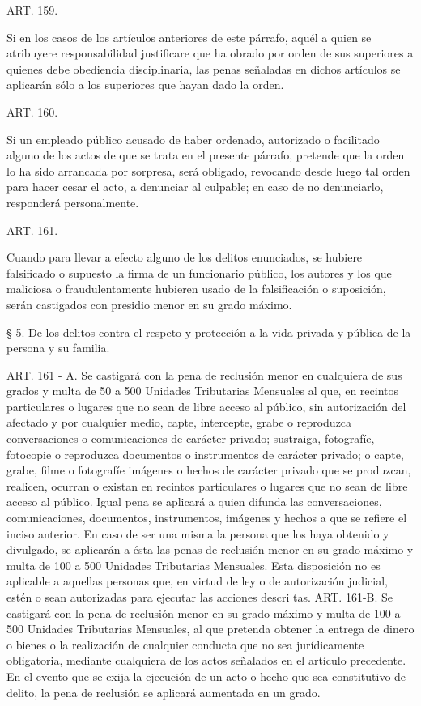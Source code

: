     ART. 159.

    Si en los casos de los artículos anteriores de este párrafo, aquél a quien se atribuyere responsabilidad justificare que ha obrado por orden de sus superiores a quienes debe obediencia disciplinaria, las penas señaladas en dichos artículos se aplicarán sólo a los superiores que hayan dado la orden.


    ART. 160.

    Si un empleado público acusado de haber ordenado, autorizado o facilitado alguno de los actos de que se trata en el presente párrafo, pretende que la orden lo ha sido arrancada por sorpresa, será obligado, revocando desde luego tal orden para hacer cesar el acto, a denunciar al culpable; en caso de no denunciarlo, responderá personalmente.




    ART. 161.

    Cuando para llevar a efecto alguno de los delitos enunciados, se hubiere falsificado o supuesto la firma de un funcionario público, los autores y los que maliciosa o fraudulentamente hubieren usado de la falsificación o suposición, serán castigados con presidio menor en su grado máximo.

    § 5. De los delitos contra el respeto y protección a la vida privada y pública de la persona y su familia.

    ART. 161 - A.
    Se castigará con la pena de reclusión menor en cualquiera de sus grados y multa de 50 a 500 Unidades Tributarias Mensuales al que, en recintos particulares o lugares que no sean de libre acceso al público, sin autorización del afectado y por cualquier medio, capte, intercepte, grabe o reproduzca conversaciones o comunicaciones de carácter privado; sustraiga, fotografíe, fotocopie o reproduzca documentos o instrumentos de carácter privado; o capte, grabe, filme o fotografíe imágenes o hechos de carácter privado que se produzcan, realicen, ocurran o existan en recintos particulares o lugares que no sean de libre acceso al público.
    Igual pena se aplicará a quien difunda las conversaciones, comunicaciones, documentos, instrumentos, imágenes y hechos a que se refiere el inciso anterior.
    En caso de ser una misma la persona que los haya obtenido y divulgado, se aplicarán a ésta las penas de reclusión menor en su grado máximo y multa de 100 a 500 Unidades Tributarias Mensuales.
    Esta disposición no es aplicable a aquellas personas que, en virtud de ley o de autorización judicial, estén o sean autorizadas para ejecutar las acciones descri tas.
    ART. 161-B.
    Se castigará con la pena de reclusión menor en su grado máximo y multa de 100 a 500 Unidades Tributarias Mensuales, al que pretenda obtener la entrega de dinero o bienes o la realización de cualquier conducta que no sea jurídicamente obligatoria, mediante cualquiera de los actos señalados en el artículo precedente. En el evento que se exija la ejecución de un acto o hecho que sea constitutivo de delito, la pena de reclusión se aplicará aumentada en un grado.


